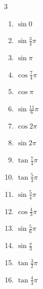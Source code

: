 \begin{multicols}{3}
\begin{enumerate}
  \item $\displaystyle \sin{0}$
        \phantom{$\displaystyle =0$}

  \item $\displaystyle \sin{\frac{3}{4}\pi}$

  \item $\displaystyle \sin{\pi}$
        \phantom{$\displaystyle =0$}

  \item $\displaystyle \cos{\frac{7}{4}\pi}$

  \item $\displaystyle \cos{\pi}$
        \phantom{$\displaystyle =-1$}

  \item $\displaystyle \sin{\frac{11}{6}\pi}$

  \item $\displaystyle \cos{2\pi}$
        \phantom{$\displaystyle =1$}

  \item $\displaystyle \sin{2\pi}$
        \phantom{$\displaystyle =0$}

  \item $\displaystyle \tan{\frac{7}{4}\pi}$
        \phantom{$\displaystyle =-1$}

  \item $\displaystyle \tan{\frac{5}{3}\pi}$

  \item $\displaystyle \sin{\frac{5}{4}\pi}$

  \item $\displaystyle \cos{\frac{4}{3}\pi}$

\columnbreak %

  \item $\displaystyle \sin{\frac{5}{6}\pi}$

  \item $\displaystyle \sin{\frac{\pi}{3}}$

  \item $\displaystyle \tan{\frac{3}{2}\pi}$
        \phantom{$\displaystyle \quad なし$}

  \item $\displaystyle \tan{\frac{4}{3}\pi}$


\end{enumerate}
\end{multicols}
